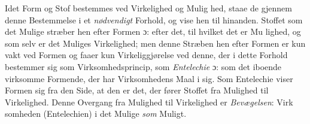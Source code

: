 \documentclass[12pt,a4paper]{book}
\begin{document}
Idet Form og Stof bestemmes ved Virkelighed og Mulig\-%
hed, staae de gjennem denne Bestemmelse i et \emph{nødvendigt}
Forhold, og vise hen til hinanden. Stoffet som det Mulige
stræber hen efter Formen ɔ: efter det, til hvilket det er Mu\-%
lighed, og som selv er det Muliges Virkelighed; men denne
Stræben hen efter Formen er kun vakt ved Formen og faaer
kun Virkeliggjørelse ved denne, der i dette Forhold bestemmer
sig som Virksomhedsprincip, som \emph{Entelechie} ɔ: som det
iboende virksomme Formende, der har Virksomhedens Maal i
sig. Som Entelechie viser Formen sig fra den Side, at den
er det, der fører Stoffet fra Mulighed til Virkelighed. Denne
Overgang fra Mulighed til Virkelighed er \emph{Bevægelsen}: Virk\-%
somheden (Entelechien) i det Mulige \emph{som} Muligt.
\end{document}
